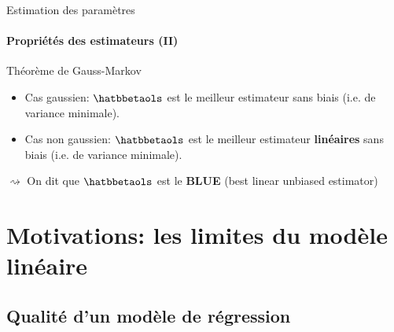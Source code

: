 \documentclass{beamer}\usepackage[]{graphicx}\usepackage[]{color}
\begin{document}
\begin{frame}{Estimation des paramètres}
   \framesubtitle{Propriétés des estimateurs (II)}

   \begin{block}{Théorème de Gauss-Markov}
     \begin{itemize}
     \item \alert{Cas gaussien}: $\hatbbetaols$ est le
       meilleur estimateur sans biais (i.e. de variance minimale).
      
     \item \alert{Cas non gaussien}: $\hatbbetaols$ est le 
       meilleur estimateur  \alert{\bf linéaires} sans biais  (i.e. de
       variance minimale).
     \end{itemize}    
   \end{block}

   $\rightsquigarrow$ On dit que $\hatbbetaols$ est le \alert{\bf BLUE} (best linear
   unbiased estimator)
\end{frame}

\section{Motivations: les limites du modèle linéaire}


\subsection{Qualité d'un modèle de régression}
\end{document}
